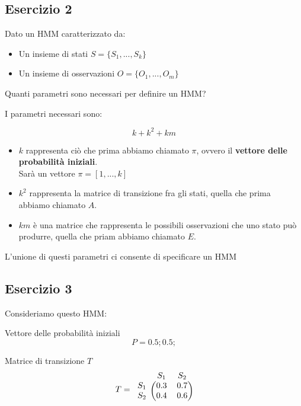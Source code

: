 \documentclass{article}
\begin{document}
\pagebreak
	\subsection{Esercizio 2}
	Dato un HMM caratterizzato da:
	\begin{itemize}
		\item Un insieme di stati $S = \{S_1, ..., S_k\}$
		\item Un insieme di osservazioni  $O = \{O_1, ..., O_m\}$
	\end{itemize}
	
	Quanti parametri sono necessari per definire un HMM?
	
	I parametri necessari sono:
	
	\[
		k + k^2 + km
	\]
	
\begin{itemize}
	\item $k$ rappresenta ciò che prima abbiamo chiamato $\pi$, ovvero il \textbf{vettore delle probabilità iniziali}. \\
	Sarà un vettore $\pi = [1, ..., k]$
	
	\item $k^2$ rappresenta la matrice di transizione fra gli stati, quella che prima abbiamo chiamato $A$.
	
	\item $km$ è una matrice che rappresenta le possibili osservazioni che uno stato può produrre, quella che priam abbiamo chiamato $E$.
\end{itemize}

L'unione di questi parametri ci consente di specificare un HMM

\pagebreak

\subsection{Esercizio 3}

Consideriamo questo HMM:

Vettore delle probabilità iniziali
\[P  = 0.5; 0.5;\]

Matrice di transizione $T$
\[
T = 
\begin{blockarray}{ccc}
	& S_1 & S_2 \\
	\begin{block}{c(cc)}
	S_1 &	0.3  &  0.7   \\
	S_2 &	0.4  &  0.6   \\
	\end{block}
\end{blockarray}
\]	
\end{document}
